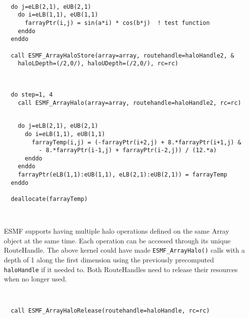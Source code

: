 \begin{verbatim}
  
  do j=eLB(2,1), eUB(2,1)
    do i=eLB(1,1), eUB(1,1)
      farrayPtr(i,j) = sin(a*i) * cos(b*j)  ! test function
    enddo
  enddo

  call ESMF_ArrayHaloStore(array=array, routehandle=haloHandle2, &
    haloLDepth=(/2,0/), haloUDepth=(/2,0/), rc=rc)
 
\end{verbatim}
 

 \begin{verbatim}

  do step=1, 4
    call ESMF_ArrayHalo(array=array, routehandle=haloHandle2, rc=rc)
 
\end{verbatim}
 

 \begin{verbatim}
    do j=eLB(2,1), eUB(2,1)
      do i=eLB(1,1), eUB(1,1)
        farrayTemp(i,j) = (-farrayPtr(i+2,j) + 8.*farrayPtr(i+1,j) &
          - 8.*farrayPtr(i-1,j) + farrayPtr(i-2,j)) / (12.*a)
      enddo
    enddo
    farrayPtr(eLB(1,1):eUB(1,1), eLB(2,1):eUB(2,1)) = farrayTemp
  enddo
  
  deallocate(farrayTemp)

 
\end{verbatim}
 

   ESMF supports having multiple halo operations defined on the same Array
   object at the same time. Each operation can be accessed through its unique
   RouteHandle. The above kernel could have made {\tt ESMF\_ArrayHalo()} calls
   with a depth of 1 along the first dimension using the previously precomputed
   {\tt haloHandle} if it needed to. Both RouteHandles need to release their
   resources when no longer used. 

 \begin{verbatim}
  

  call ESMF_ArrayHaloRelease(routehandle=haloHandle, rc=rc)
 
\end{verbatim}
 

